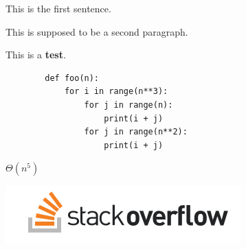 
\begin{prob}
    This is the first sentence.

    This is supposed to be a second paragraph.

    This is a \textbf{test}.

    \begin{verbatim}
        def foo(n):
            for i in range(n**3):
                for j in range(n):
                    print(i + j)
                for j in range(n**2):
                    print(i + j)
    \end{verbatim}

    \begin{soln}
        $\Theta(n^5)$

        \includegraphics{./image.png}
    \end{soln}

\end{prob}
